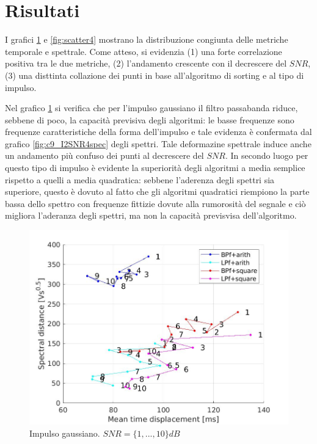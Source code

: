 \documentclass[9pt,twocolumn,twoside]{osajnl}
\begin{document}
\section{Risultati}
\label{risultati}

I grafici \ref{fig:scatter2} e \ref{fig:scatter4} mostrano la distribuzione congiunta delle metriche temporale e spettrale. Come atteso, si evidenzia (1) una forte correlazione positiva tra le due metriche, (2) l'andamento crescente con il decrescere del $SNR$, (3) una disttinta collazione dei punti in base all'algoritmo di sorting e al tipo di impulso.


Nel grafico \ref{fig:scatter2} si verifica che per l'impulso gaussiano il filtro passabanda riduce, sebbene di poco, la capacità previsiva degli algoritmi: le basse frequenze sono frequenze caratteristiche della forma dell'impulso e tale evidenza è confermata dal grafico \ref{fig:c9_I2SNR4spec} degli spettri. Tale deformazine spettrale induce anche un andamento più confuso dei punti al decrescere del $SNR$. In secondo luogo per questo tipo di impulso è evidente la superiorità degli algoritmi a media semplice rispetto a quelli a media quadratica: sebbene l'aderenza degli spettri sia superiore, questo è dovuto al fatto che gli algoritmi quadratici riempiono la parte bassa dello spettro con frequenze fittizie dovute alla rumorosità del segnale e ciò migliora l'aderanza degli spettri, ma non la capacità previsvisa dell'algoritmo.



\begin{figure}[htbp]
\centering
\includegraphics[width=1\linewidth]{results/scatter2.jpg}
\caption{Impulso gaussiano. $SNR= \{1, ..., 10\}dB$}
\label{fig:scatter2}
\end{figure}
\end{document}
